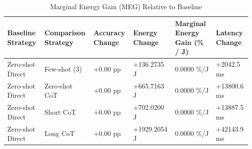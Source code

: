 \begin{table}
\caption{Marginal Energy Gain (MEG) Relative to Baseline}
\label{tab:marginal_energy_gain}
\begin{tabular}{llllll}
\toprule
Baseline Strategy & Comparison Strategy & Accuracy Change & Energy Change & Marginal Energy Gain (\% / J) & Latency Change \\
\midrule
Zero-shot Direct & Few-shot (3) & +0.00 pp & +136.2735 J & 0.0000 \%/J & +2042.5 ms \\
Zero-shot Direct & Zero-shot CoT & +0.00 pp & +665.7163 J & 0.0000 \%/J & +13800.6 ms \\
Zero-shot Direct & Short CoT & +0.00 pp & +702.0200 J & 0.0000 \%/J & +13887.5 ms \\
Zero-shot Direct & Long CoT & +0.00 pp & +1929.2054 J & 0.0000 \%/J & +42143.9 ms \\
\bottomrule
\end{tabular}
\end{table}
